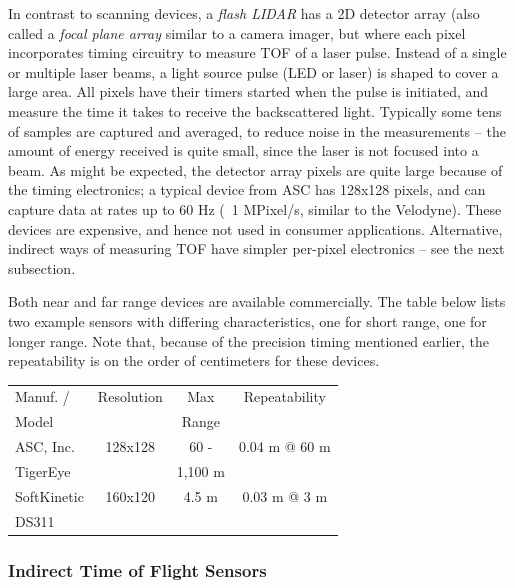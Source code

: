 \documentclass[twocolumn,oneside]{book}
\begin{document}
In contrast to scanning devices, a {\em flash LIDAR} has a 2D detector
array (also called a {\em focal plane array} similar to a camera
imager, but where each pixel incorporates timing circuitry to measure
TOF of a laser pulse.  Instead of a single or multiple laser beams, a
light source pulse (LED or laser) is shaped to cover a large area.
All pixels have their timers started when the pulse is initiated, and
measure the time it takes to receive the backscattered light.
Typically some tens of samples are captured and averaged, to reduce
noise in the measurements -- the amount of energy received is quite
small, since the laser is not focused into a beam.  As might be
expected, the detector array pixels are quite large because of the
timing electronics; a typical device from ASC \cite{} has 128x128
pixels, and can capture data at rates up to 60 Hz (~1 MPixel/s,
similar to the Velodyne).  These devices are expensive, and hence not
used in consumer applications.  Alternative, indirect ways of
measuring TOF have simpler per-pixel electronics -- see the next
subsection. 

Both near and far range devices are available commercially.  The table
below lists two example sensors with differing characteristics, one
for short range, one for longer range.  Note that, because of the
precision timing mentioned earlier, the repeatability is on the order
of centimeters for these devices.

\begin{table}
\begin{tabular}{|l|c|c|c|}
\hline
Manuf. / & Resolution & Max  & Repeatability \\
Model  & & Range & \\
\hline
ASC, Inc. & 128x128 & 60 - & 0.04 m @ 60 m \\
TigerEye & & 1,100 m & \\
\hline
SoftKinetic & 160x120 & 4.5 m & 0.03 m @ 3 m \\
DS311 & & &\\
\hline
\end{tabular}
\end{table}


\subsubsection{Indirect Time of Flight Sensors}
\end{document}
